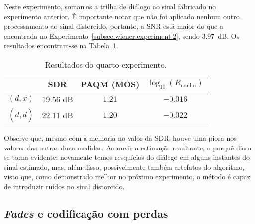 Neste experimento, somamos a trilha de diálogo ao sinal fabricado no experimento anterior. É importante notar que não foi aplicado nenhum outro processamento ao sinal distorcido, portanto, a SNR está maior do que a encontrada no Experimento~\ref{subsec:wiener:experiment-2}, sendo $3.97$~dB. Os resultados encontram-se na Tabela~\ref{tab:wf:experiment-4}.
{\def\arraystretch{1.25}\tabcolsep=10pt
\begin{table}[!ht]
    \centering
    \caption[Resultados do quarto experimento: \textit{soft clipping} com ruído aditivo]{Resultados do quarto experimento.}
    \label{tab:wf:experiment-4}
    \begin{tabular}{cccc}
        \toprule
                         & SDR        & PAQM (MOS)  & $\log_{10}(R_{\text{nonlin}})$ \\
        \midrule
        $(d, x)$       & $19.56$ dB & $1.21$  & $-0.016$                 \\
        $(d, \hat{d})$ & $22.11$ dB & $1.20$ & $-0.022$                \\ \bottomrule
    \end{tabular}
\end{table}
}

Observe que, mesmo com a melhoria no valor da SDR, houve uma piora nos valores das outras duas medidas. Ao ouvir a estimação resultante, o porquê disso se torna evidente: novamente temos resquícios do diálogo em alguns instantes do sinal estimado, mas, além disso, possivelmente também artefatos do algoritmo, visto que, como demonstrado melhor no próximo experimento, o método é capaz de introduzir ruídos no sinal distorcido.

\subsection{\textit{Fades} e codificação com perdas}
\label{subsec:wiener:experiment-5}

